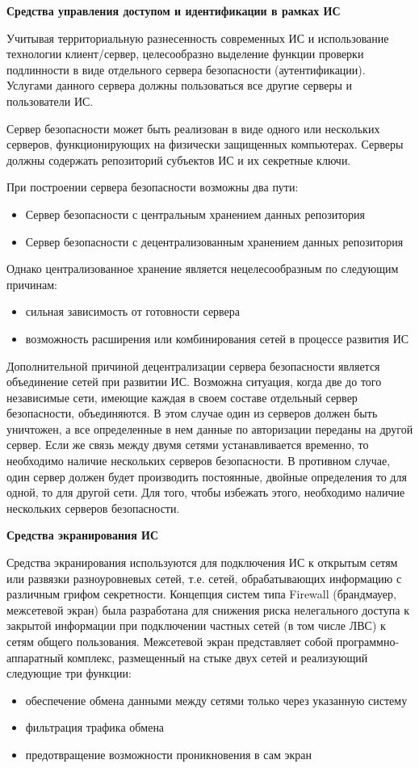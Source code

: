 \bigbreak
\textbf{Средства управления доступом и идентификации в рамках ИС}

Учитывая территориальную разнесенность современных ИС и использование технологии клиент/сервер,
целесообразно выделение функции проверки подлинности в виде отдельного сервера безопасности (аутентификации).
Услугами данного сервера должны пользоваться все другие серверы и пользователи ИС.

Сервер безопасности может быть реализован в виде одного или нескольких серверов, функционирующих на физически
защищенных компьютерах. Серверы должны содержать репозиторий субъектов ИС и их секретные ключи.

При построении сервера безопасности возможны два пути:
\begin{itemize}
    \item Сервер безопасности с центральным хранением данных репозитория
    \item Сервер безопасности с децентрализованным хранением данных репозитория
\end{itemize}

Однако централизованное хранение является нецелесообразным по следующим причинам:
\begin{itemize}
    \item сильная зависимость от готовности сервера
    \item возможность расширения или комбинирования сетей в процессе развития ИС
\end{itemize}

Дополнительной причиной децентрализации сервера безопасности является объединение сетей при развитии ИС.
Возможна ситуация, когда две до того независимые сети, имеющие каждая в своем составе отдельный сервер безопасности,
объединяются. В этом случае один из серверов должен быть уничтожен, а все определенные в нем данные по авторизации
переданы на другой сервер. Если же связь между двумя сетями устанавливается временно, то необходимо наличие
нескольких серверов безопасности. В противном случае, один сервер должен будет производить постоянные,
двойные определения то для одной, то для другой сети. Для того, чтобы избежать этого, необходимо
наличие нескольких серверов безопасности.

\bigbreak
\textbf{Средства экранирования ИС}

Средства экранирования используются для подключения ИС к открытым сетям или развязки разноуровневых сетей,
т.е. сетей, обрабатывающих информацию с различным грифом секретности. Концепция систем типа Firewall
(брандмауер, межсетевой экран) была разработана для снижения риска нелегального доступа к закрытой информации при
подключении частных сетей (в том числе ЛВС) к сетям общего пользования. Межсетевой экран представляет собой
программно-аппаратный комплекс, размещенный на стыке двух сетей и реализующий следующие три функции:
\begin{itemize}
    \item обеспечение обмена данными между сетями только через указанную систему
    \item фильтрация трафика обмена
    \item предотвращение возможности проникновения в сам экран
\end{itemize}

